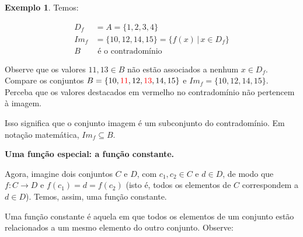 \documentclass[12pt,openright,twoside,a4paper]{article}
\theoremstyle{definition}
\newtheorem{example}{Exemplo}[section]
\begin{document}
\begin{example}
		Temos:
		
		\begin{align*}
			D_f &= A = \{1,2,3,4\}\\
			Im_f &= \{10, 12, 14, 15\} = \{f(x) \,|\, x \in D_f\} \\
			B &\text{ é o contradomínio}			
		\end{align*}
		
		Observe que os valores $11, 13 \in B$ não estão associados a nenhum $x \in D_f$. Compare os conjuntos $B = \{10, \textcolor{red}{11}, 12, \textcolor{red}{13}, 14, 15\}$ e $Im_f = \{10, 12, 14, 15\}$. Perceba que os valores destacados em vermelho no contradomínio não pertencem à imagem.
		
		Isso significa que o conjunto imagem é um subconjunto do contradomínio. Em notação matemática, $Im_f \subseteq B$. 
	\end{example}
	
	\textbf{Uma função especial: a função constante.}
	
	Agora, imagine dois conjuntos $C$ e $D$, com $c_1, c_2 \in C$ e $d \in D$, de modo que $f: C \longrightarrow D$ e $f(c_1) = d = f(c_2)$ (isto é, todos os elementos de $C$ correspondem a $d \in D$). Temos, assim, uma função constante.
	
	Uma função constante é aquela em que todos os elementos de um conjunto estão relacionados a um mesmo elemento do outro conjunto. Observe:
	
\end{document}
